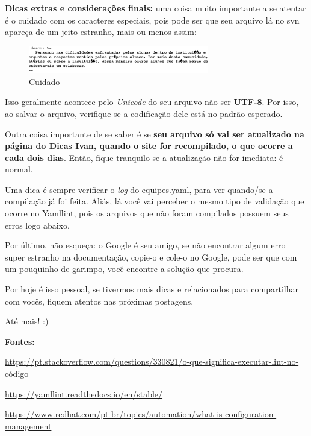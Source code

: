 \textbf{Dicas extras e considerações finais:} uma coisa muito importante a se atentar é o cuidado com os caracteres especiais, pois pode ser que seu arquivo lá no \acs{svn} apareça de um jeito estranho, mais ou menos assim:

\begin{figure}[htb]
        \centering
        \caption{Cuidado}
        \includegraphics[width=0.7\textwidth]{anexos/Imagens_Blog/cuidados.png}
        \end{figure}
        \FloatBarrier

Isso geralmente acontece pelo \textit{Unicode} do seu arquivo não ser \textbf{UTF-8}. Por isso, ao salvar o arquivo, verifique se a codificação dele está no padrão esperado.

Outra coisa importante de se saber é se \textbf{seu arquivo só vai ser atualizado na página do Dicas Ivan, quando o site for recompilado, o que ocorre a cada dois dias}. Então, fique tranquilo se a atualização não for imediata: é normal. 

Uma dica é sempre verificar o \textit{log} do equipes.yaml, para ver quando/se a compilação já foi feita. Aliás, lá você vai perceber o mesmo tipo de validação que ocorre no \gls{Yamllint}, pois os arquivos que não foram compilados possuem seus erros logo abaixo.

Por último, não esqueça: o Google é seu amigo, se não encontrar algum erro super estranho na documentação, copie-o e cole-o no Google, pode ser que com um pouquinho de garimpo, você encontre a solução que procura.

Por hoje é isso pessoal, se tivermos mais dicas e relacionados para compartilhar com vocês, fiquem atentos nas próximas postagens.

Até mais! :) 

\textbf{Fontes:}

\noindent\href{https://pt.stackoverflow.com/questions/330821/o-que-significa-executar-lint-no-código}{https://pt.stackoverflow.com/questions/330821/o-que-significa-executar-lint-no-código}

\noindent\href{https://yamllint.readthedocs.io/en/stable/}{https://yamllint.readthedocs.io/en/stable/}

\noindent\href{https://www.redhat.com/pt-br/topics/automation/what-is-configuration-management}{https://www.redhat.com/pt-br/topics/automation/what-is-configuration-management}

